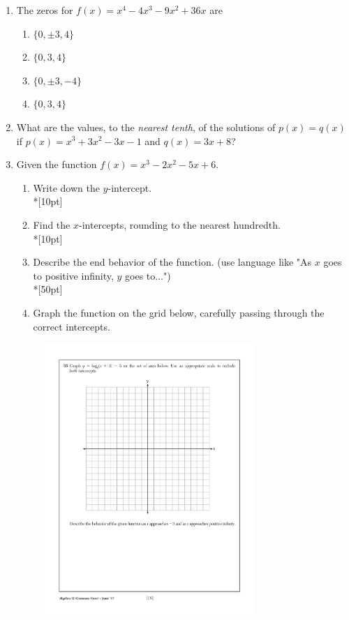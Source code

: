 \documentclass[12pt, oneside]{article}
\begin{document}
\begin{enumerate}
\item The zeros for $f(x)=x^4-4x^3-9x^2+36x$ are
\begin{enumerate}
    \item $\{0, \pm 3, 4 \}$
    \item $\{0, 3, 4 \}$
    \item $\{0, \pm 3, -4 \}$
    \item $\{0, 3,4 \}$
\end{enumerate} %

\item What are the values, to the \emph{nearest tenth}, of the solutions of $p(x)=q(x)$ if $p(x)=x^3+3x^2-3x-1$ and $q(x)=3x+8$?

\item Given the function $f(x)=x^3-2x^2-5x+6$. 
\begin{enumerate}
    \item Write down the $y$-intercept.\\*[10pt]
    \item Find the $x$-intercepts, rounding to the nearest hundredth.\\*[10pt]
    \item Describe the end behavior of the function. (use language like "As $x$ goes to positive infinity, $y$ goes to...")\\*[50pt]
    \item Graph the function on the grid below, carefully passing through the correct intercepts. 
\end{enumerate}
\begin{figure}[!ht]
    \centering
    \includegraphics[width=0.75\textwidth]{regents-grid.pdf}
\end{figure}


\end{enumerate}
\end{document}

